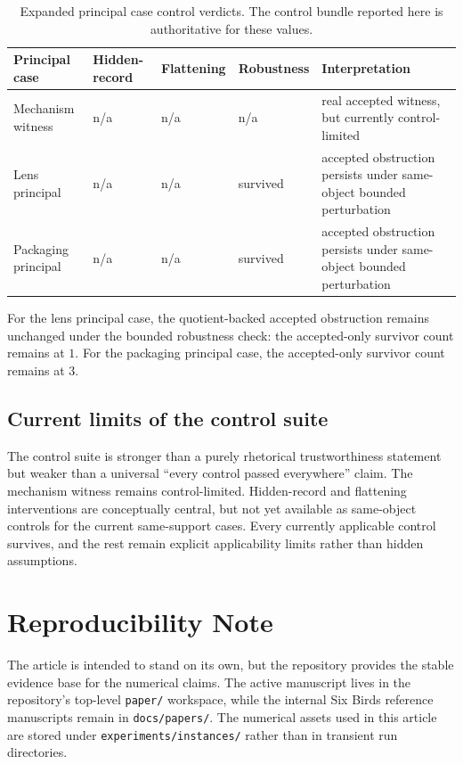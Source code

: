 \documentclass[11pt]{article}
\theoremstyle{definition}
\begin{document}
\begin{table}[t]
    \centering
    \caption{Expanded principal case control verdicts. The control bundle reported here is authoritative for these values.}
    \label{tab:flagship-controls-extended}
    \footnotesize
    \begin{tabularx}{\linewidth}{>{\raggedright\arraybackslash}p{3.2cm}>{\raggedright\arraybackslash}p{1.6cm}>{\raggedright\arraybackslash}p{1.6cm}>{\raggedright\arraybackslash}p{1.8cm}>{\raggedright\arraybackslash}X}
        \toprule
        Principal case & Hidden-record & Flattening & Robustness & Interpretation \\
        \midrule
        Mechanism witness & n/a & n/a & n/a & real accepted witness, but currently control-limited \\
        Lens principal & n/a & n/a & survived & accepted obstruction persists under same-object bounded perturbation \\
        Packaging principal & n/a & n/a & survived & accepted obstruction persists under same-object bounded perturbation \\
        \bottomrule
    \end{tabularx}
\end{table}

For the lens principal case, the quotient-backed accepted obstruction remains unchanged under the bounded robustness check: the accepted-only survivor count remains at \(1\). For the packaging principal case, the accepted-only survivor count remains at \(3\).

\subsection{Current limits of the control suite}

The control suite is stronger than a purely rhetorical trustworthiness statement but weaker than a universal ``every control passed everywhere'' claim. The mechanism witness remains control-limited. Hidden-record and flattening interventions are conceptually central, but not yet available as same-object controls for the current same-support cases. Every currently applicable control survives, and the rest remain explicit applicability limits rather than hidden assumptions.

\section{Reproducibility Note}\label{app:reproducibility}
The article is intended to stand on its own, but the repository provides the stable evidence base for the numerical claims. The active manuscript lives in the repository's top-level \texttt{paper/} workspace, while the internal Six Birds reference manuscripts remain in \texttt{docs/papers/}. The numerical assets used in this article are stored under \texttt{experiments/instances/} rather than in transient run directories.
\end{document}
